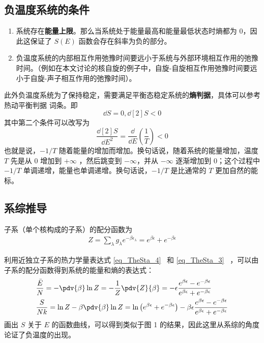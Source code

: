 \subsection{负温度系统的条件}
\begin{enumerate}
\item 系统存在\textbf{能量上限}。那么当系统处于能量最高和能量最低状态时熵都为 $0$，因此这保证了 $S(E)$ 函数会存在斜率为负的部分。
\item 负温度系统的内部相互作用弛豫时间要远小于系统与外部环境相互作用的弛豫时间。（例如在本文讨论的核自旋的例子中，自旋-自旋相互作用弛豫时间要远小于自旋-声子相互作用的弛豫时间）。
\end{enumerate}
此外负温度系统为了保持稳定，需要满足平衡态稳定系统的\textbf{熵判据}，具体可以参考热动平衡判据 词条。即
\begin{equation}
\dd S=0,\dd[2]{S}<0
\end{equation}
其中第二个条件可以改写为
\begin{equation}
\frac{\dd[2]{S}}{\dd E^2}=\frac{\dd }{\dd E}\left(\frac{1}{T}\right)<0
\end{equation}
也就是说，$-1/T$ 随着能量的增加而增加。换句话说，随着系统的能量增加，温度 $T$ 先是从 $0$ 增加到 $+\infty$ ，然后跳变到 $-\infty$，并从 $-\infty$ 逐渐增加到 $0$；这个过程中 $-1/T$ 单调递增，能量也单调递增。换句话说，$-1/T$ 是比通常的 $T$ 更加自然的能标。
\subsection{系综推导}
子系（单个核构成的子系）的配分函数为
\begin{equation}
\begin{aligned}
Z=\sum_{\lambda}g_\lambda e^{-\beta \epsilon_\lambda}=e^{\beta \epsilon } +e^{-\beta \epsilon}
\end{aligned}
\end{equation}

利用近独立子系的热力学量表达式 \autoref{eq_TheSta_4}~ 和 \autoref{eq_TheSta_3}~ ，可以由子系的配分函数得到系统的能量和熵的表达式：
\begin{equation}
\begin{aligned}
&\frac{\bar E}{N}=-\pdv{\beta} \ln Z=-\frac{1}{Z}\pdv{Z}{\beta}
=-\epsilon\frac{e^{\beta\epsilon}-e^{-\beta\epsilon}}{e^{\beta\epsilon}+e^{-\beta\epsilon}}\\
&\frac{S}{Nk}
=\ln Z-\beta\pdv{\beta} \ln Z=
\ln \left(e^{\beta\epsilon}+e^{-\beta\epsilon}\right)-
\beta\epsilon \frac{e^{\beta\epsilon}-e^{-\beta\epsilon}}{e^{\beta\epsilon}+e^{-\beta\epsilon}}
\end{aligned}
\end{equation}
画出 $S$ 关于 $E$ 的函数曲线，可以得到类似于图 1 的结果，因此这里从系综的角度论证了负温度的出现。
